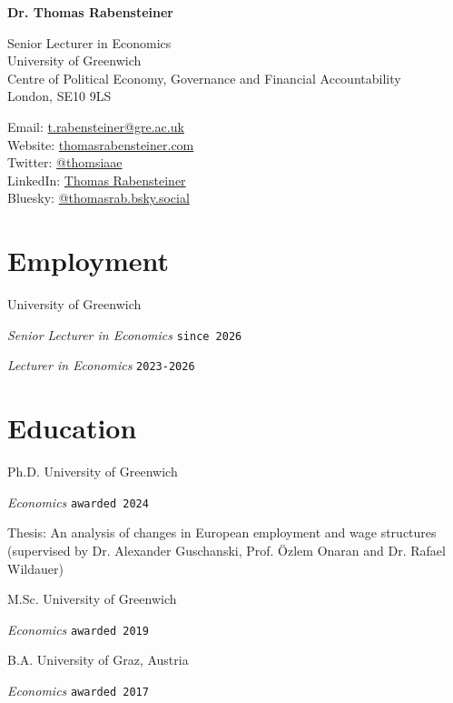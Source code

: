 \documentclass[letterpaper]{article}
\renewenvironment{itemize}{
  \begin{list}{}
    { \setlength{\itemsep}{5pt}
      \setlength{\parsep}{0pt}
      \setlength{\topsep}{0pt}
      \setlength{\leftmargin}{0em} } }{
  \end{list}}
\begin{document}
{\huge\bf  Dr. Thomas Rabensteiner}

\bigskip
Senior Lecturer in Economics\\
University of Greenwich\\
Centre of Political Economy, Governance and Financial Accountability\\
London, SE10 9LS
\medskip



Email: \href{mailto:t.rabensteiner@gre.ac.uk}{t.rabensteiner@gre.ac.uk} \\
Website: \href{http://thomasrabensteiner.com}{thomasrabensteiner.com}
\\
Twitter:  \href{https://twitter.com/thomsiaae}{@thomsiaae}
\\
LinkedIn: \href{https://www.linkedin.com/in/thomas-rabensteiner-9a1b8a1b0/}{Thomas Rabensteiner}
\\
Bluesky: \href{https://bsky.app/profile/thomasrab.bsky.social}{@thomasrab.bsky.social}

\section*{Employment}
\begin{itemize}
    \item University of Greenwich
    \begin{itemize}
        \item \textit{Senior Lecturer in Economics} \hfill \texttt{since 2026}
        \item \textit{Lecturer in Economics} \hfill \texttt{2023-2026}
    \end{itemize} 
\end{itemize}

\section*{Education}
\begin{itemize}
    \item Ph.D. University of Greenwich
    \begin{itemize}
        \item \textit{Economics} \hfill \texttt{awarded 2024} 
            \item Thesis: An analysis of changes in European employment and wage structures (supervised by Dr. Alexander Guschanski, Prof. Özlem Onaran and Dr. Rafael Wildauer)
    \end{itemize} 
    \item M.Sc. University of Greenwich
    \begin{itemize}
        \item \textit{Economics} \hfill \texttt{awarded 2019} 
    \end{itemize}
    \item B.A. University of Graz, Austria
    \begin{itemize}
        \item \textit{Economics} \hfill \texttt{awarded 2017} 
    \end{itemize}    
\end{itemize}
\end{document}
